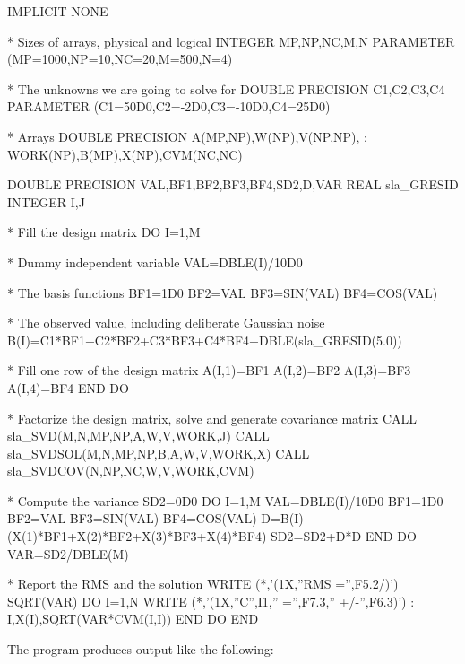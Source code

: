\documentclass[11pt,twoside,nolof]{starlink}
\begin{document}
\begin{terminalv}
            IMPLICIT NONE

      *  Sizes of arrays, physical and logical
            INTEGER MP,NP,NC,M,N
            PARAMETER (MP=1000,NP=10,NC=20,M=500,N=4)

      *  The unknowns we are going to solve for
            DOUBLE PRECISION C1,C2,C3,C4
            PARAMETER (C1=50D0,C2=-2D0,C3=-10D0,C4=25D0)

      *  Arrays
            DOUBLE PRECISION A(MP,NP),W(NP),V(NP,NP),
           :                 WORK(NP),B(MP),X(NP),CVM(NC,NC)

            DOUBLE PRECISION VAL,BF1,BF2,BF3,BF4,SD2,D,VAR
            REAL sla_GRESID
            INTEGER I,J

      *  Fill the design matrix
            DO I=1,M

      *     Dummy independent variable
               VAL=DBLE(I)/10D0

      *     The basis functions
               BF1=1D0
               BF2=VAL
               BF3=SIN(VAL)
               BF4=COS(VAL)

      *     The observed value, including deliberate Gaussian noise
               B(I)=C1*BF1+C2*BF2+C3*BF3+C4*BF4+DBLE(sla_GRESID(5.0))

      *     Fill one row of the design matrix
               A(I,1)=BF1
               A(I,2)=BF2
               A(I,3)=BF3
               A(I,4)=BF4
            END DO

      *  Factorize the design matrix, solve and generate covariance matrix
            CALL sla_SVD(M,N,MP,NP,A,W,V,WORK,J)
            CALL sla_SVDSOL(M,N,MP,NP,B,A,W,V,WORK,X)
            CALL sla_SVDCOV(N,NP,NC,W,V,WORK,CVM)

      *  Compute the variance
            SD2=0D0
            DO I=1,M
               VAL=DBLE(I)/10D0
               BF1=1D0
               BF2=VAL
               BF3=SIN(VAL)
               BF4=COS(VAL)
               D=B(I)-(X(1)*BF1+X(2)*BF2+X(3)*BF3+X(4)*BF4)
               SD2=SD2+D*D
            END DO
            VAR=SD2/DBLE(M)

      *  Report the RMS and the solution
            WRITE (*,'(1X,''RMS ='',F5.2/)') SQRT(VAR)
            DO I=1,N
               WRITE (*,'(1X,''C'',I1,'' ='',F7.3,'' +/-'',F6.3)')
           :                                         I,X(I),SQRT(VAR*CVM(I,I))
            END DO
            END
\end{terminalv}
\goodbreak
The program produces output like the following:
\end{document}
